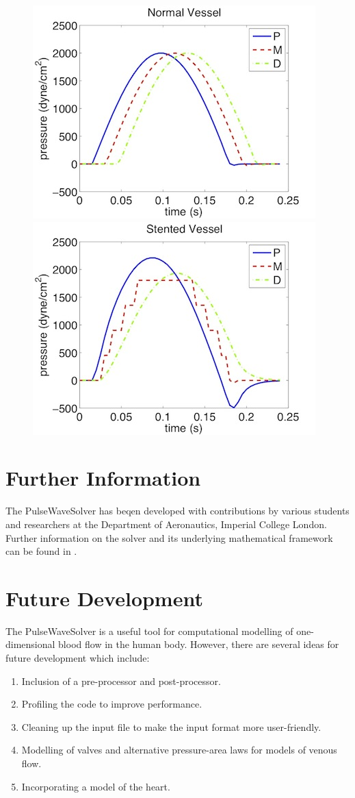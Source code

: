 \begin{figure}
	\includegraphics[width=0.49\linewidth]{Figures/pressure_normal_vessel.jpg}
	\includegraphics[width=0.49\linewidth]{Figures/pressure_stented_vessel.jpg}
\end{figure}

\section{Further Information}
The PulseWaveSolver has beqen developed with contributions by various students
and researchers at the Department of Aeronautics, Imperial College London. 
Further information on the solver and its underlying mathematical framework 
can be found in \cite{Ro12,Pi12}.

\section{Future Development}
The PulseWaveSolver is a useful tool for computational modelling of
one-dimensional blood flow in the human body. However, there are several ideas
for future development which include:
\begin{enumerate}
\item Inclusion of a pre-processor and post-processor.
\item Profiling the code to improve performance.
\item Cleaning up the input file to make the input format more user-friendly.
\item Modelling of valves and alternative pressure-area laws for models of
venous flow.
\item Incorporating a model of the heart.
\end{enumerate}

